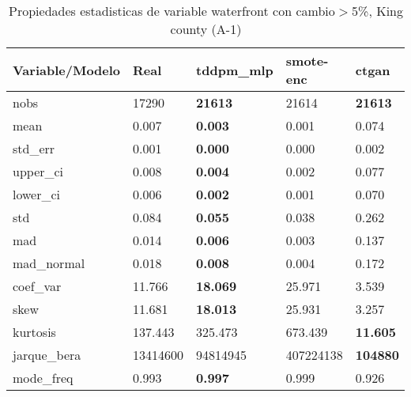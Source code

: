 \begin{table}[H]
\centering
\fontsize{8}{14}\selectfont
\caption{Propiedades estadisticas de variable waterfront con cambio\ensuremath{>}5\%, King county (A-1)}
\label{table-stats-king county-a-1-waterfront-short}
\begin{tabular}{|l|m{10em}|m{10em}|m{10em}|m{10em}|}
\hline
 \rowcolor[gray]{0.8}
Variable/Modelo & Real & tddpm\_mlp & smote-enc & ctgan \\
\hline nobs & 17290 & \bfseries 21613 & \cellcolor[rgb]{0.9, 0.54, 0.52} 21614 & \bfseries 21613 \\
\hline mean & 0.007 & \bfseries 0.003 & 0.001 & \cellcolor[rgb]{0.9, 0.54, 0.52} 0.074 \\
\hline std\_err & 0.001 & \bfseries 0.000 & 0.000 & \cellcolor[rgb]{0.9, 0.54, 0.52} 0.002 \\
\hline upper\_ci & 0.008 & \bfseries 0.004 & 0.002 & \cellcolor[rgb]{0.9, 0.54, 0.52} 0.077 \\
\hline lower\_ci & 0.006 & \bfseries 0.002 & 0.001 & \cellcolor[rgb]{0.9, 0.54, 0.52} 0.070 \\
\hline std & 0.084 & \bfseries 0.055 & 0.038 & \cellcolor[rgb]{0.9, 0.54, 0.52} 0.262 \\
\hline mad & 0.014 & \bfseries 0.006 & 0.003 & \cellcolor[rgb]{0.9, 0.54, 0.52} 0.137 \\
\hline mad\_normal & 0.018 & \bfseries 0.008 & 0.004 & \cellcolor[rgb]{0.9, 0.54, 0.52} 0.172 \\
\hline coef\_var & 11.766 & \bfseries 18.069 & \cellcolor[rgb]{0.9, 0.54, 0.52} 25.971 & 3.539 \\
\hline skew & 11.681 & \bfseries 18.013 & \cellcolor[rgb]{0.9, 0.54, 0.52} 25.931 & 3.257 \\
\hline kurtosis & 137.443 & 325.473 & \cellcolor[rgb]{0.9, 0.54, 0.52} 673.439 & \bfseries 11.605 \\
\hline jarque\_bera & 13414600 & 94814945 & \cellcolor[rgb]{0.9, 0.54, 0.52} 407224138 & \bfseries 104880 \\
\hline mode\_freq & 0.993 & \bfseries 0.997 & 0.999 & \cellcolor[rgb]{0.9, 0.54, 0.52} 0.926 \\
\hline
\end{tabular}
\end{table}
